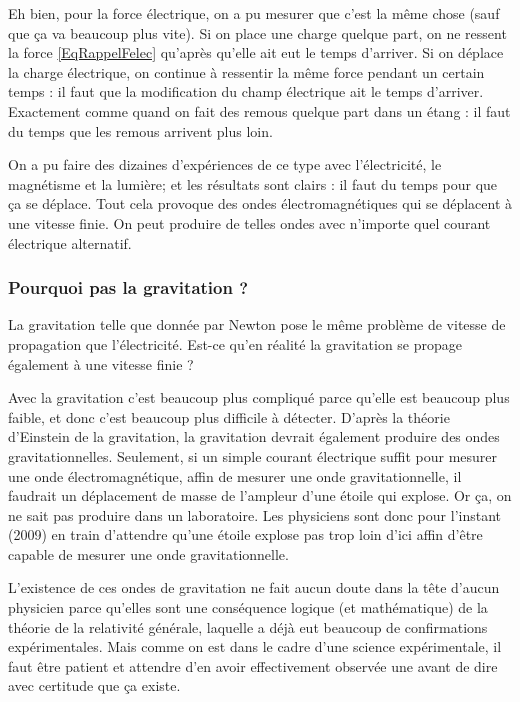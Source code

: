 \documentclass[a4paper,12pt]{book}
\theoremstyle{mes_exemples}	\newtheorem{exemple}[numtho]{Exemple}
\theoremstyle{mes_tho}
\begin{document}
Eh bien, pour la force électrique, on a pu mesurer que c'est la même chose (sauf que ça va beaucoup plus vite). Si on place une charge quelque part, on ne ressent la force \eqref{EqRappelFelec} qu'après qu'elle ait eut le temps d'arriver. Si on déplace la charge électrique, on continue à ressentir la même force pendant un certain temps : il faut que la modification du champ électrique ait le temps d'arriver. Exactement comme quand on fait des remous quelque part dans un étang : il faut du temps que les remous arrivent plus loin.

On a pu faire des dizaines d'expériences de ce type avec l'électricité, le magnétisme et la lumière; et les résultats sont clairs : il faut du temps pour que ça se déplace. Tout cela provoque des ondes électromagnétiques qui se déplacent à une vitesse finie. On peut produire de telles ondes avec n'importe quel courant électrique alternatif.

\subsubsection{Pourquoi pas la gravitation ?}

La gravitation telle que donnée par Newton pose le même problème de vitesse de propagation que l'électricité. Est-ce qu'en réalité la gravitation se propage également à une vitesse finie ?

Avec la gravitation c'est beaucoup plus compliqué parce qu'elle est beaucoup plus faible, et donc c'est beaucoup plus difficile à détecter. D'après la théorie d'Einstein de la gravitation, la gravitation devrait également produire des ondes gravitationnelles. Seulement, si un simple courant électrique suffit pour mesurer une onde électromagnétique, affin de mesurer une onde gravitationnelle, il faudrait un déplacement de masse de l'ampleur d'une étoile qui explose. Or ça, on ne sait pas produire dans un laboratoire. Les physiciens sont donc pour l'instant (2009) en train d'attendre qu'une étoile explose pas trop loin d'ici affin d'être capable de mesurer une onde gravitationnelle.

L'existence de ces ondes de gravitation ne fait aucun doute dans la tête d'aucun physicien parce qu'elles sont une conséquence logique (et mathématique) de la théorie de la relativité générale, laquelle a déjà eut beaucoup de confirmations expérimentales. Mais comme on est dans le cadre d'une science expérimentale, il faut être patient et attendre d'en avoir effectivement observée une avant de dire avec certitude que ça existe.
\end{document}

